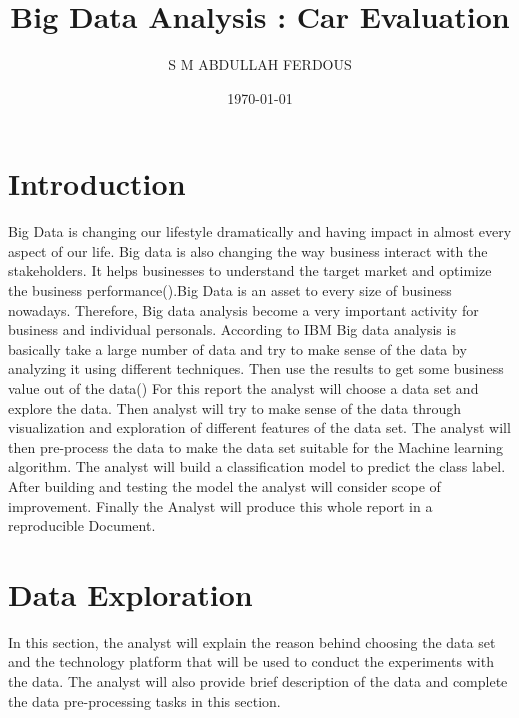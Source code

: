 \documentclass{article}
\title{Big Data Analysis : Car Evaluation}
\author{S M ABDULLAH FERDOUS}
\date{\today}
\begin{document}

\maketitle

\tableofcontents
\listoffigures



\newpage
\section{Introduction}
Big Data is changing our lifestyle dramatically and having impact in almost every aspect of our life. Big data is also changing the way business interact with the stakeholders. It helps businesses to understand the target market and optimize the business performance(\textcite {Marr}).Big Data is an asset to every size of business nowadays. Therefore, Big data analysis become a very important activity for business and individual personals. According to IBM Big data analysis is basically take a large number of data and try to make sense of the data by analyzing it using different techniques. Then use the results to get some business value out of the data(\textcite {Jack})
\break
\break
For this report the analyst will choose a data set and explore the data. Then analyst will try to make sense of the data through visualization and exploration of different features of the data set. The analyst will then pre-process the data to make the data set suitable for the Machine learning algorithm. The analyst will build a classification model to predict the class label. After building and testing the model the analyst will consider scope of improvement. Finally  the Analyst will produce this whole report in a reproducible Document. 

\newpage
\section{Data Exploration}
In this section, the analyst will explain the reason behind choosing the data set and the technology platform that will be used to conduct the experiments with the data. The analyst will also provide brief description of the data and complete the data pre-processing tasks in this section.
\end{document}
